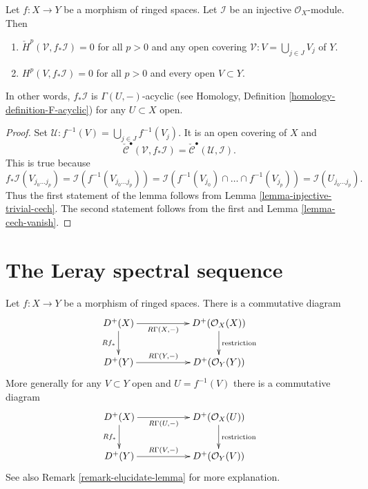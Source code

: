 \begin{lemma}
\label{lemma-pushforward-injective}
Let $f : X \to Y$ be a morphism of ringed spaces.
Let $\mathcal{I}$ be an injective $\mathcal{O}_X$-module.
Then
\begin{enumerate}
\item $\check{H}^p(\mathcal{V}, f_*\mathcal{I}) = 0$
for all $p > 0$ and any open covering
$\mathcal{V} : V = \bigcup_{j \in J} V_j$ of $Y$.
\item $H^p(V, f_*\mathcal{I}) = 0$ for all $p > 0$ and
every open $V \subset Y$.
\end{enumerate}
In other words, $f_*\mathcal{I}$ is $\Gamma(U, -)$-acyclic
(see Homology, Definition \ref{homology-definition-F-acyclic})
for any $U \subset X$ open.
\end{lemma}

\begin{proof}
Set $\mathcal{U} : f^{-1}(V) = \bigcup_{j \in J} f^{-1}(V_j)$.
It is an open covering of $X$ and
$$
\check{\mathcal{C}}^\bullet(\mathcal{V}, f_*\mathcal{I}) =
\check{\mathcal{C}}^\bullet(\mathcal{U}, \mathcal{I}).
$$
This is true because
$$
f_*\mathcal{I}(V_{j_0 \ldots j_p})
= \mathcal{I}(f^{-1}(V_{j_0 \ldots j_p})) =
\mathcal{I}(f^{-1}(V_{j_0}) \cap \ldots \cap f^{-1}(V_{j_p}))
= \mathcal{I}(U_{j_0 \ldots j_p}).
$$
Thus the first statement of the lemma follows from
Lemma \ref{lemma-injective-trivial-cech}. The second statement
follows from the first and Lemma \ref{lemma-cech-vanish}.
\end{proof}














\section{The Leray spectral sequence}
\label{section-Leray}

\begin{lemma}
\label{lemma-before-Leray}
Let $f : X \to Y$ be a morphism of ringed spaces.
There is a commutative diagram
$$
\xymatrix{
D^{+}(X) \ar[rr]_-{R\Gamma(X, -)} \ar[d]_{Rf_*} & &
D^{+}(\mathcal{O}_X(X)) \ar[d]^{\text{restriction}} \\
D^{+}(Y) \ar[rr]^-{R\Gamma(Y, -)} & &
D^{+}(\mathcal{O}_Y(Y))
}
$$
More generally for any $V \subset Y$ open and $U = f^{-1}(V)$ there
is a commutative diagram
$$
\xymatrix{
D^{+}(X) \ar[rr]_-{R\Gamma(U, -)} \ar[d]_{Rf_*} & &
D^{+}(\mathcal{O}_X(U)) \ar[d]^{\text{restriction}} \\
D^{+}(Y) \ar[rr]^-{R\Gamma(V, -)} & &
D^{+}(\mathcal{O}_Y(V))
}
$$
See also Remark \ref{remark-elucidate-lemma} for more explanation.
\end{lemma}

